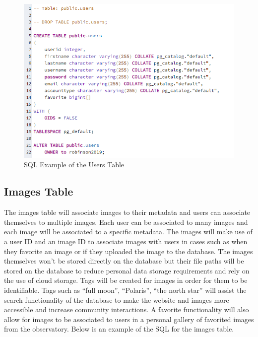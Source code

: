 \documentclass[12pt]{article}
\begin{document}
\begin{figure}[h]
	\centering
	\includegraphics[width=\linewidth]{database_user_table}
	\caption{SQL Example of the Users Table}
	\label{fig:SQL Users Table}
\end{figure}

\subsection{Images Table}

The images table will associate images to their metadata and users can associate themselves to multiple images.  Each user can be associated to many images and each image will be associated to a specific metadata.  The images will make use of a user ID and an image ID to associate images with users in cases such as when they favorite an image or if they uploaded the image to the database.  The images themselves won’t be stored directly on the database but their file paths will be stored on the database to reduce personal data storage requirements and rely on the use of cloud storage.  Tags will be created for images in order for them to be identifiable. Tags such as “full moon”, “Polaris”, “the north star” will assist the search functionality of the database to make the website and images more accessible and increase community interactions.  A favorite functionality will also allow for images to be associated to users in a personal gallery of favorited images from the observatory.  Below is an example of the SQL for the images table.
\end{document}
